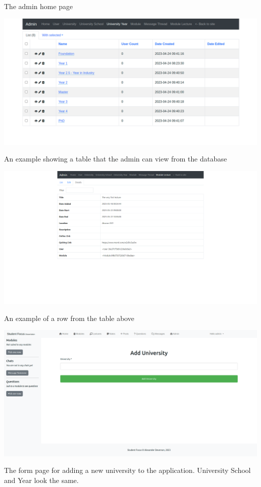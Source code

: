The admin home page

\includegraphics[scale=0.20]{images/application/49 - admin_table_example.png}

An example showing a table that the admin can view from the database

\includegraphics[scale=0.20]{images/application/52 - admin_table_row_single.png}

An example of a row from the table above

\includegraphics[scale=0.20]{images/application/50 - admin_add_uni.png}

The form page for adding a new university to the application. University School and Year look the same.

